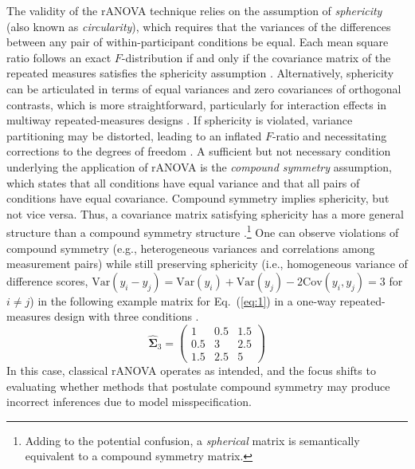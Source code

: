 \documentclass[preprint,12pt,authoryear]{elsarticle}
\begin{document}
The validity of the rANOVA technique relies on the assumption of \textit{sphericity} (also known as \textit{circularity}), which requires that the variances of the differences between any pair of within-participant conditions be equal. Each mean square ratio follows an exact $F$-distribution if and only if the covariance matrix of the repeated measures satisfies the sphericity assumption \citep{huynh_conditions_1970,rouanet_comparison_1970}. Alternatively, sphericity can be articulated in terms of equal variances and zero covariances of orthogonal contrasts, which is more straightforward, particularly for interaction effects in multiway repeated-measures designs \citep{lane_assumption_2016,langenberg_understanding_2023}. If sphericity is violated, variance partitioning may be distorted, leading to an inflated $F$-ratio and necessitating corrections to the degrees of freedom \citep{greenhouse_methods_1959,huynh_estimation_1976,mauchly_significance_1940}. A sufficient but not necessary condition underlying the application of rANOVA is the \textit{compound symmetry} assumption, which states that all conditions have equal variance and that all pairs of conditions have equal covariance. Compound symmetry implies sphericity, but not vice versa. Thus, a covariance matrix satisfying sphericity has a more general structure than a compound symmetry structure \citep[p.~232]{cousineau_correlation-adjusted_2019}.\footnote[3]{Adding to the potential confusion, a \textit{spherical} matrix is semantically equivalent to a compound symmetry matrix.} One can observe violations of compound symmetry (e.g., heterogeneous variances and correlations among measurement pairs) while still preserving sphericity (i.e., homogeneous variance of difference scores, $\mathrm{Var}(y_i-y_j)=\mathrm{Var}(y_i)+\mathrm{Var}(y_j)-2\mathrm{Cov}(y_i,y_j)=3$ for $i\neq j$) in the following example matrix for Eq.~(\ref{eq:1}) in a one-way repeated-measures design with three conditions \citep{huynh_conditions_1970}.
\begin{equation*}
	\hat{\boldsymbol{\Sigma}}_3=\begin{pmatrix}1 & 0.5 & 1.5 \\ 0.5 & 3 & 2.5 \\ 1.5 & 2.5 & 5 \end{pmatrix}
\end{equation*}
In this case, classical rANOVA operates as intended, and the focus shifts to evaluating whether methods that postulate compound symmetry may produce incorrect inferences due to model misspecification.
\end{document}

